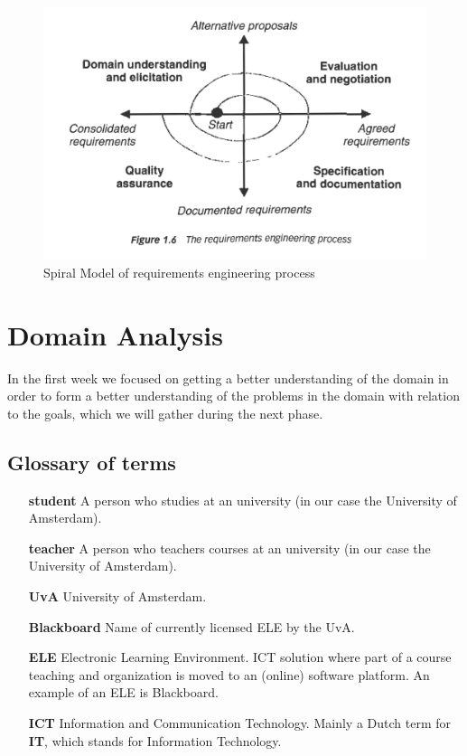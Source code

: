 \begin{figure}[h]
	\centering
	\includegraphics[width=0.75\linewidth]{images/re_process}
	\caption{Spiral Model of requirements engineering process}
	\label{fig:spiral_model}
\end{figure}


\chapter{Domain Analysis}
In the first week we focused on getting a better understanding of the domain in order to form a better understanding of the problems in the domain with relation to the goals, which we will gather during the next phase.

\section{Glossary of terms}
\begin{itemize}
	\item[\textbf{student}] A person who studies at an university (in our case the University of Amsterdam).
	\item[\textbf{teacher}] A person who teachers courses at an university (in our case the University of Amsterdam).
	\item[\textbf{UvA}] University of Amsterdam. 
	\item[\textbf{Blackboard}] Name of currently licensed ELE by the UvA. 
	\item[\textbf{ELE}] Electronic Learning Environment. ICT solution where part of a course teaching and organization is moved to an (online) software platform. An example of an ELE is Blackboard.
	\item[\textbf{ICT}] Information and Communication Technology. Mainly a Dutch term for \textbf{IT}, which stands for Information Technology.
	
\end{itemize}

